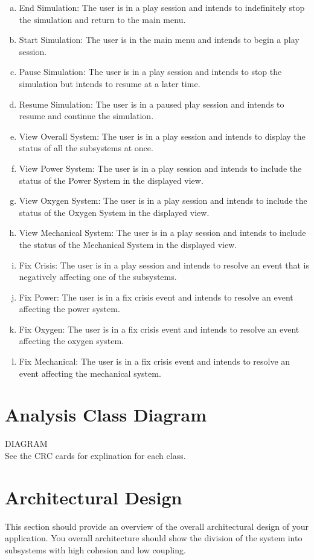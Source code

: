 \documentclass[12pt, titlepage]{article}
\begin{document}
\begin{enumerate}[a)]
	\item End Simulation: The user is in a play session and intends to indefinitely stop the simulation and return to the main menu.
	\item Start Simulation: The user is in the main menu and intends to begin a play session.
	\item Pause Simulation: The user is in a play session and intends to stop the simulation but intends to resume at a later time.
	\item Resume Simulation: The user is in a paused play session and intends to resume and continue the simulation.
	\item View Overall System: The user is in a play session and intends to display the status of all the subsystems at once.
	\item View Power System: The user is in a play session and intends to include the status of the Power System in the displayed view.
	\item View Oxygen System: The user is in a play session and intends to include the status of the Oxygen System in the displayed view.
	\item View Mechanical System: The user is in a play session and intends to include the status of the Mechanical System in the displayed view.
	\item Fix Crisis: The user is in a play session and intends to resolve an event that is negatively affecting one of the subsystems.
	\item Fix Power: The user is in a fix crisis event and intends to resolve an event affecting the power system.
	\item Fix Oxygen: The user is in a fix crisis event and intends to resolve an event affecting the oxygen system.
	\item Fix Mechanical: The user is in a fix crisis event and intends to resolve an event affecting the mechanical system.
\end{enumerate}

\section{Analysis Class Diagram}
\label{sec:analysis_class_diagram}
DIAGRAM \\
See the CRC cards for explination for each class.


\section{Architectural Design}
\label{sec:architectural_design}
This section should provide an overview of the overall architectural design of your application. You overall architecture should show the division of the system into subsystems with high cohesion and low coupling.
\end{document}
